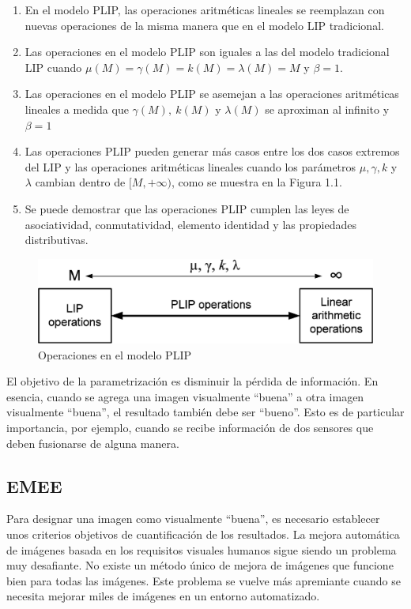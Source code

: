 \begin{enumerate}
	\item En el modelo PLIP, las operaciones aritméticas lineales se reemplazan con nuevas operaciones de la misma manera que en el modelo LIP tradicional.
	\item Las operaciones en el modelo PLIP son iguales a las del modelo tradicional LIP cuando $\mu(M) = \gamma(M) = k(M) = \lambda(M) = M$ y $\beta = 1$.
	\item Las operaciones en el modelo PLIP se asemejan a las operaciones aritméticas lineales a medida que $\gamma(M),~k(M)$ y $\lambda(M)$ se aproximan al infinito y $\beta = 1$
	\item Las operaciones PLIP pueden generar más casos entre los dos casos extremos del LIP y las operaciones aritméticas lineales cuando los parámetros $\mu, \gamma, k$ y $\lambda$ cambian dentro de $[M, +\infty)$, como se muestra en la Figura 1.1.
	\item Se puede demostrar que las operaciones PLIP cumplen las leyes de asociatividad, conmutatividad, elemento identidad y las propiedades distributivas.
\end{enumerate}

\begin{figure}
	\begin{center}
		\includegraphics[width=8.0 cm]{images/plip_scheme.png}
		\caption{Operaciones en el modelo PLIP}
	\end{center}
\end{figure}

El objetivo de la parametrizaci\'on es disminuir la p\'erdida de informaci\'on. En esencia, cuando se agrega una imagen visualmente ``buena'' a otra imagen visualmente ``buena'', el resultado también debe ser ``bueno''. Esto es de particular importancia, por ejemplo, cuando se recibe información de dos sensores que deben fusionarse de alguna manera.

\subsection{EMEE}

Para designar una imagen como visualmente ``buena'', es necesario establecer unos criterios objetivos de cuantificación de los resultados. La mejora automática de imágenes basada en los requisitos visuales humanos sigue siendo un problema muy desafiante. No existe un método único de mejora de imágenes que funcione bien para todas las imágenes. Este problema se vuelve más apremiante cuando se necesita mejorar miles de imágenes en un entorno automatizado.

